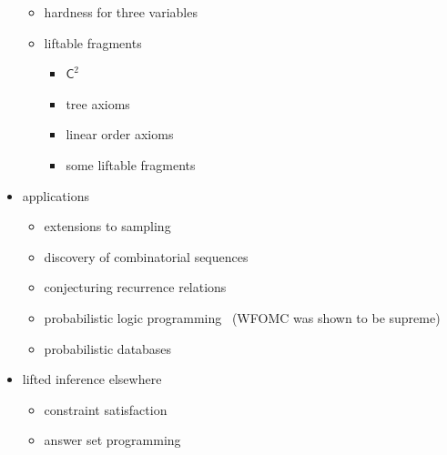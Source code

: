 \documentclass{article}
\theoremstyle{definition}
\newcommand{\Ctwo}{$\mathsf{C}^{2}$}
\begin{document}
\begin{itemize}
\begin{itemize}
          \item hardness for three variables~\cite{DBLP:conf/pods/BeameBGS15}
          \item liftable fragments
                \begin{itemize}
                  \item \Ctwo~\cite{DBLP:journals/jair/Kuzelka21}
                  \item tree axioms~\cite{DBLP:journals/ai/BremenK23}
                  \item linear order axioms~\cite{DBLP:conf/aaai/TothK23}
                  \item some liftable fragments~\cite{DBLP:conf/nips/KazemiKBP16}
                \end{itemize}
        \end{itemize}
  \item applications
        \begin{itemize}
          \item extensions to
                sampling~\cite{DBLP:conf/aaai/WangB0K22,DBLP:conf/lics/WangP0K23}
          \item discovery of combinatorial
                sequences~\cite{DBLP:conf/ijcai/SvatosJT0K23}
          \item conjecturing recurrence
                relations~\cite{DBLP:conf/ilp/BarvinekB0ZK21}
          \item probabilistic logic
                programming~\cite{DBLP:journals/ijar/RiguzziBZCL17} (WFOMC was
                shown to be supreme)
          \item probabilistic databases~\cite{DBLP:journals/debu/GribkoffSB14}
        \end{itemize}
  \item lifted inference elsewhere
        \begin{itemize}
          \item constraint satisfaction~\cite{DBLP:journals/jair/TotisDRK23}
          \item answer set programming~\cite{DBLP:journals/ijar/AzzoliniR23}
        \end{itemize}
\end{itemize}
\end{document}
